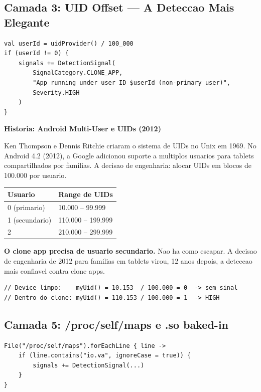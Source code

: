 \documentclass[12pt,a4paper]{article}
\begin{document}
\subsection{Camada 3: UID Offset --- A Deteccao Mais Elegante}

\begin{lstlisting}
val userId = uidProvider() / 100_000
if (userId != 0) {
    signals += DetectionSignal(
        SignalCategory.CLONE_APP,
        "App running under user ID $userId (non-primary user)",
        Severity.HIGH
    )
}
\end{lstlisting}

\begin{historybox}
\textbf{Historia: Android Multi-User e UIDs (2012)}

Ken Thompson e Dennis Ritchie criaram o sistema de UIDs no Unix em 1969.
No Android 4.2 (2012), a Google adicionou suporte a multiplos usuarios
para tablets compartilhados por familias. A decisao de engenharia: alocar
UIDs em blocos de 100.000 por usuario.

\begin{center}
\begin{tabular}{ll}
\toprule
Usuario & Range de UIDs \\
\midrule
0 (primario) & 10.000 -- 99.999 \\
1 (secundario) & 110.000 -- 199.999 \\
2 & 210.000 -- 299.999 \\
\bottomrule
\end{tabular}
\end{center}

\textbf{O clone app precisa de usuario secundario.} Nao ha como escapar.
A decisao de engenharia de 2012 para familias em tablets virou,
12 anos depois, a deteccao mais confiavel contra clone apps.

\begin{lstlisting}
// Device limpo:    myUid() = 10.153  / 100.000 = 0  -> sem sinal
// Dentro do clone: myUid() = 110.153 / 100.000 = 1  -> HIGH
\end{lstlisting}
\end{historybox}

\subsection{Camada 5: /proc/self/maps e .so baked-in}

\begin{lstlisting}
File("/proc/self/maps").forEachLine { line ->
    if (line.contains("io.va", ignoreCase = true)) {
        signals += DetectionSignal(...)
    }
}
\end{lstlisting}
\end{document}
